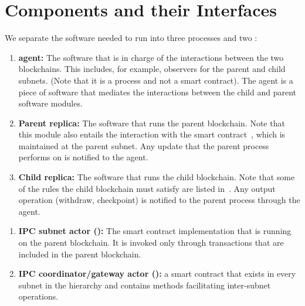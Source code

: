  \section{Components and their Interfaces}
 \label{sec:components}
We separate the software needed to run \nameAbbr into three processes and two \dapps:

\begin{enumerate}
    \item \textbf{\nameAbbr agent:} The software that is in charge of the interactions between the two blockchains. This includes, for example, observers for the parent and child subnets. (Note that it is a process and not a smart contract). The \nameAbbr agent is a piece of software that mediates the interactions between the child and parent \smr software modules.    
    \item \textbf{Parent \smr replica:} The software that runs the parent blockchain. Note that this module also entails the interaction with the \nameAbbr smart contract~\sa, which is maintained at the parent subnet. Any update that the parent process performs on \sa is notified to the \nameAbbr agent.
    \item \textbf{Child \smr replica:} The software that runs the child blockchain. Note that some of the rules the child blockchain must satisfy are listed in~\sa. Any output operation (withdraw, checkpoint) is notified to the parent process through the \nameAbbr agent. 
\end{enumerate}
\begin{enumerate}
	\item \textbf{IPC subnet actor (\sa):} The smart contract implementation that is running on the parent blockchain. It is invoked only through transactions that are included in the parent blockchain.
	\item \textbf{IPC coordinator/gateway actor (\gw):} a smart contract that exists in every subnet in the \nameAbbr hierarchy and contains methods facilitating inter-subnet operations.	
\end{enumerate}


